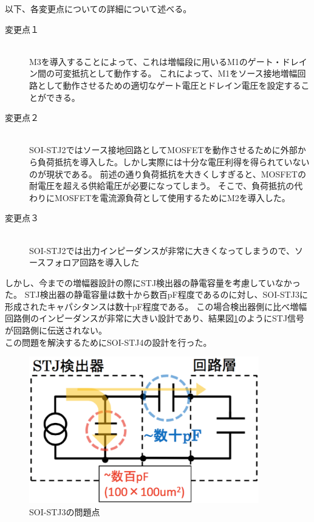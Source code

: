 		以下、各変更点についての詳細について述べる。
		\begin{description}
			\item[変更点１]\mbox{}\\
				M3を導入することによって、これは増幅段に用いるM1のゲート・ドレイン間の可変抵抗として動作する。
				これによって、M1をソース接地増幅回路として動作させるための適切なゲート電圧とドレイン電圧を設定することができる。
			\item[変更点２]\mbox{}\\
				SOI-STJ2ではソース接地回路としてMOSFETを動作させるために外部から負荷抵抗を導入した。しかし実際には十分な電圧利得を得られていないのが現状である。
				前述の通り負荷抵抗を大きくしすぎると、MOSFETの耐電圧を超える供給電圧が必要になってしまう。
				そこで、負荷抵抗の代わりにMOSFETを電流源負荷として使用するためにM2を導入した。
			\item[変更点３]\mbox{}\\
				SOI-STJ2では出力インピーダンスが非常に大きくなってしまうので、ソースフォロア回路を導入した
		\end{description}
		しかし、今までの増幅器設計の際にSTJ検出器の静電容量を考慮していなかった。
		STJ検出器の静電容量は数十から数百pF程度であるのに対し、SOI-STJ3に形成されたキャパシタンスは数十pF程度である。
		この場合検出器側に比べ増幅回路側のインピーダンスが非常に大きい設計であり、結果図\ref{fig:SOISTJ3_problem}のようにSTJ信号が回路側に伝送されない。\\
		この問題を解決するためにSOI-STJ4の設計を行った。
		\begin{figure}[htbp]
			\begin{center}
				\includegraphics[width=10.0cm]{./Chapter/Chapter3/Picture/SOISTJ3_problem.eps}
				\caption{SOI-STJ3の問題点}
				\label{fig:SOISTJ3_problem}
			\end{center}
		\end{figure}
		\clearpage
